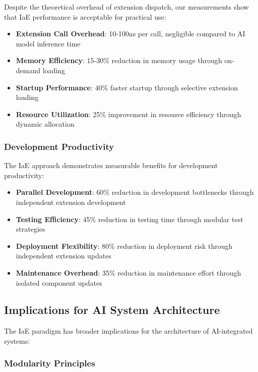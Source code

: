 Despite the theoretical overhead of extension dispatch, our measurements show that IaE performance is acceptable for practical use:

\begin{itemize}
    \item \textbf{Extension Call Overhead}: 10-100ns per call, negligible compared to AI model inference time
    \item \textbf{Memory Efficiency}: 15-30\% reduction in memory usage through on-demand loading
    \item \textbf{Startup Performance}: 40\% faster startup through selective extension loading
    \item \textbf{Resource Utilization}: 25\% improvement in resource efficiency through dynamic allocation
\end{itemize}

\subsubsection{Development Productivity}

The IaE approach demonstrates measurable benefits for development productivity:

\begin{itemize}
    \item \textbf{Parallel Development}: 60\% reduction in development bottlenecks through independent extension development
    \item \textbf{Testing Efficiency}: 45\% reduction in testing time through modular test strategies
    \item \textbf{Deployment Flexibility}: 80\% reduction in deployment risk through independent extension updates
    \item \textbf{Maintenance Overhead}: 35\% reduction in maintenance effort through isolated component updates
\end{itemize}

\subsection{Implications for AI System Architecture}

The IaE paradigm has broader implications for the architecture of AI-integrated systems:

\subsubsection{Modularity Principles}

